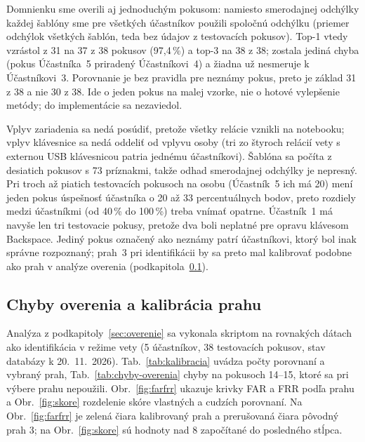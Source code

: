 Domnienku sme overili aj jednoduchým pokusom: namiesto smerodajnej odchýlky
každej šablóny sme pre všetkých účastníkov použili spoločnú odchýlku (priemer
odchýlok všetkých šablón, teda bez údajov z testovacích pokusov). Top-1 vtedy
vzrástol z 31 na 37 z 38 pokusov (97,4\,\%) a top-3 na 38 z 38; zostala jediná
chyba (pokus Účastníka~5 priradený Účastníkovi~4) a žiadna už nesmeruje
k Účastníkovi~3. Porovnanie je bez pravidla pre neznámy pokus, preto je
základ 31 z 38 a nie 30 z 38. Ide o jeden pokus na malej vzorke, nie o hotové
vylepšenie metódy; do implementácie sa nezaviedol.

Vplyv zariadenia sa nedá posúdiť, pretože všetky relácie vznikli na
notebooku; vplyv klávesnice sa nedá oddeliť od vplyvu osoby (tri zo štyroch
relácií vety s externou USB klávesnicou patria jednému účastníkovi). Šablóna sa
počíta z desiatich pokusov s 73 príznakmi, takže odhad smerodajnej odchýlky
je nepresný. Pri troch až piatich testovacích pokusoch na osobu (Účastník~5 ich
má 20) mení jeden pokus úspešnosť účastníka o 20 až 33 percentuálnych bodov,
preto rozdiely medzi účastníkmi (od 40\,\% do 100\,\%) treba vnímať opatrne.
Účastník~1 má navyše len tri testovacie pokusy, pretože dva boli neplatné pre
opravu klávesom Backspace. Jediný pokus označený ako neznámy patrí účastníkovi,
ktorý bol inak správne rozpoznaný; prah~3 pri identifikácii by sa preto mal kalibrovať
podobne ako prah v analýze overenia (podkapitola~\ref{sec:kalibracia}).

\subsection{Chyby overenia a kalibrácia prahu}
\label{sec:kalibracia}

Analýza z podkapitoly~\ref{sec:overenie} sa vykonala skriptom
 na rovnakých dátach ako identifikácia v režime vety
(5 účastníkov, 38 testovacích pokusov, stav databázy k 20.~11.~2026).
Tab.~\ref{tab:kalibracia} uvádza počty porovnaní a vybraný prah,
Tab.~\ref{tab:chyby-overenia} chyby na pokusoch 14--15, ktoré sa pri výbere prahu
nepoužili. Obr.~\ref{fig:farfrr} ukazuje krivky FAR a FRR podľa prahu
a Obr.~\ref{fig:skore} rozdelenie skóre vlastných a cudzích porovnaní. Na
Obr.~\ref{fig:farfrr} je zelená čiara kalibrovaný prah a prerušovaná čiara pôvodný
prah 3; na Obr.~\ref{fig:skore} sú hodnoty nad 8 započítané do posledného stĺpca.

